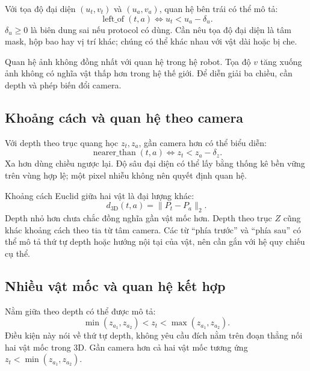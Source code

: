 Với tọa độ đại diện $(u_t,v_t)$ và $(u_a,v_a)$, quan hệ bên trái có thể mô tả:
\begin{equation}
    \operatorname{left\_of}(t,a)\Longleftrightarrow u_t<u_a-\delta_u.
    \label{eq:theory-left}
\end{equation}
$\delta_u\geq0$ là biên dung sai nếu protocol có dùng. Cần nêu tọa độ đại diện là tâm mask, hộp bao hay vị trí khác; chúng có thể khác nhau với vật dài hoặc bị che.

Quan hệ ảnh không đồng nhất với quan hệ trong hệ robot. Tọa độ $v$ tăng xuống ảnh không có nghĩa vật thấp hơn trong hệ thế giới. Để diễn giải ba chiều, cần depth và phép biến đổi camera.

\subsection{Khoảng cách và quan hệ theo camera}

Với depth theo trục quang học $z_t,z_a$, gần camera hơn có thể biểu diễn:
\begin{equation}
    \operatorname{nearer\_than}(t,a)\Longleftrightarrow z_t<z_a-\delta_z.
    \label{eq:theory-nearer}
\end{equation}
Xa hơn dùng chiều ngược lại. Độ sâu đại diện có thể lấy bằng thống kê bền vững trên vùng hợp lệ; một pixel nhiễu không nên quyết định quan hệ.

Khoảng cách Euclid giữa hai vật là đại lượng khác:
\begin{equation}
    d_{\mathrm{3D}}(t,a)=\|P_t-P_a\|_2.
    \label{eq:theory-distance-3d}
\end{equation}
Depth nhỏ hơn chưa chắc đồng nghĩa gần vật mốc hơn. Depth theo trục $Z$ cũng khác khoảng cách theo tia từ tâm camera. Các từ “phía trước” và “phía sau” có thể mô tả thứ tự depth hoặc hướng nội tại của vật, nên cần gắn với hệ quy chiếu cụ thể.

\subsection{Nhiều vật mốc và quan hệ kết hợp}

Nằm giữa theo depth có thể được mô tả:
\begin{equation}
    \min(z_{a_1},z_{a_2})<z_t<\max(z_{a_1},z_{a_2}).
    \label{eq:theory-between-depth}
\end{equation}
Điều kiện này nói về thứ tự depth, không yêu cầu đích nằm trên đoạn thẳng nối hai vật mốc trong 3D. Gần camera hơn cả hai vật mốc tương ứng $z_t<\min(z_{a_1},z_{a_2})$.

